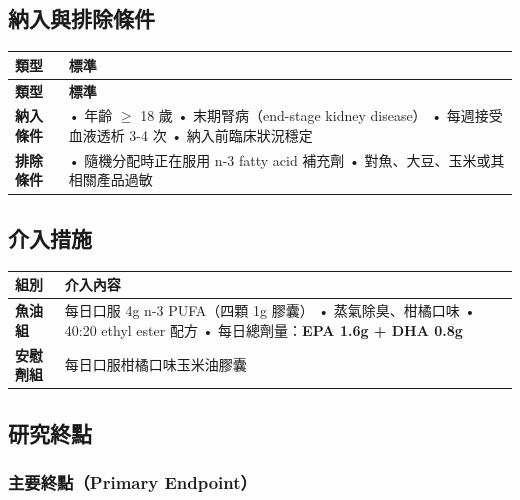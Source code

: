 \documentclass[12pt,a4paper]{article}
\begin{document}
\subsection{納入與排除條件}

\begin{longtable}{p{3cm}p{11cm}}
\toprule
\textbf{類型} & \textbf{標準} \\
\midrule
\endfirsthead

\toprule
\textbf{類型} & \textbf{標準} \\
\midrule
\endhead

\bottomrule
\endfoot

\textbf{納入條件} &
• 年齡 $\geq$ 18 歲\newline
• 末期腎病（end-stage kidney disease）\newline
• 每週接受血液透析 3-4 次\newline
• 納入前臨床狀況穩定 \\
\midrule
\textbf{排除條件} &
• 隨機分配時正在服用 n-3 fatty acid 補充劑\newline
• 對魚、大豆、玉米或其相關產品過敏 \\
\bottomrule
\end{longtable}

\subsection{介入措施}

\begin{longtable}{p{3cm}p{11cm}}
\toprule
\textbf{組別} & \textbf{介入內容} \\
\midrule
\endfirsthead

\bottomrule
\endfoot

\textbf{魚油組} &
每日口服 4g n-3 PUFA（四顆 1g 膠囊）\newline
• 蒸氣除臭、柑橘口味\newline
• 40:20 ethyl ester 配方\newline
• 每日總劑量：\textbf{EPA 1.6g + DHA 0.8g} \\
\midrule
\textbf{安慰劑組} &
每日口服柑橘口味玉米油膠囊 \\
\bottomrule
\end{longtable}

\subsection{研究終點}

\subsubsection{主要終點（Primary Endpoint）}
\end{document}

